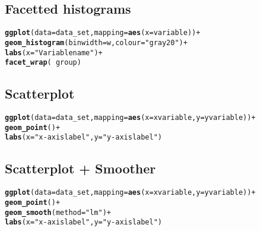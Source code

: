 \documentclass[10pt]{report}\usepackage[]{graphicx}\usepackage[]{color}
\makeatletter
\newcommand{\hlstr}[1]{\textcolor[rgb]{0.192,0.494,0.8}{#1}}%
\newcommand{\hlopt}[1]{\textcolor[rgb]{0,0,0}{#1}}%
\newcommand{\hlstd}[1]{\textcolor[rgb]{0.345,0.345,0.345}{#1}}%
\newcommand{\hlkwc}[1]{\textcolor[rgb]{0.333,0.667,0.333}{#1}}%
\newcommand{\hlkwd}[1]{\textcolor[rgb]{0.737,0.353,0.396}{\textbf{#1}}}%
\newenvironment{kframe}{%
 \def\at@end@of@kframe{}%
 \ifinner\ifhmode%
  \def\at@end@of@kframe{\end{minipage}}%
  \begin{minipage}{\columnwidth}%
 \fi\fi%
 \def\FrameCommand##1{\hskip\@totalleftmargin \hskip-\fboxsep
 \colorbox{shadecolor}{##1}\hskip-\fboxsep
     \hskip-\linewidth \hskip-\@totalleftmargin \hskip\columnwidth}%
 \MakeFramed {\advance\hsize-\width
   \@totalleftmargin\z@ \linewidth\hsize
   \@setminipage}}%
 {\par\unskip\endMakeFramed%
 \at@end@of@kframe}
\newenvironment{knitrout}{}{} %
\makeatother
\begin{document}
\begin{multicols}{2}
\subsection*{Facetted histograms}
\begin{knitrout}\small
{}\color{fgcolor}\begin{kframe}
\begin{alltt}
\hlkwd{ggplot}\hlstd{(}\hlkwc{data} \hlstd{= data_set,} \hlkwc{mapping} \hlstd{=} \hlkwd{aes}\hlstd{(}\hlkwc{x} \hlstd{= variable))} \hlopt{+}
  \hlkwd{geom_histogram}\hlstd{(}\hlkwc{binwidth} \hlstd{= w,} \hlkwc{colour} \hlstd{=} \hlstr{"gray20"}\hlstd{)} \hlopt{+}
  \hlkwd{labs}\hlstd{(}\hlkwc{x} \hlstd{=} \hlstr{"Variable name"}\hlstd{)} \hlopt{+}
  \hlkwd{facet_wrap}\hlstd{(}\hlopt{~} \hlstd{group)}
\end{alltt}
\end{kframe}
\end{knitrout}
\squeeze
\subsection*{Scatterplot}
\begin{knitrout}\small
{}\color{fgcolor}\begin{kframe}
\begin{alltt}
\hlkwd{ggplot}\hlstd{(}\hlkwc{data} \hlstd{= data_set,} \hlkwc{mapping} \hlstd{=} \hlkwd{aes}\hlstd{(}\hlkwc{x} \hlstd{= xvariable,} \hlkwc{y} \hlstd{= yvariable))} \hlopt{+}
  \hlkwd{geom_point}\hlstd{()} \hlopt{+}
  \hlkwd{labs}\hlstd{(}\hlkwc{x} \hlstd{=} \hlstr{"x-axis label"}\hlstd{,} \hlkwc{y} \hlstd{=} \hlstr{"y-axis label"}\hlstd{)}
\end{alltt}
\end{kframe}
\end{knitrout}
\squeeze
\subsection*{Scatterplot + Smoother}
\begin{knitrout}\small
{}\color{fgcolor}\begin{kframe}
\begin{alltt}
\hlkwd{ggplot}\hlstd{(}\hlkwc{data} \hlstd{= data_set,} \hlkwc{mapping} \hlstd{=} \hlkwd{aes}\hlstd{(}\hlkwc{x} \hlstd{= xvariable,} \hlkwc{y} \hlstd{= yvariable))} \hlopt{+}
  \hlkwd{geom_point}\hlstd{()} \hlopt{+}
  \hlkwd{geom_smooth}\hlstd{(}\hlkwc{method} \hlstd{=} \hlstr{"lm"}\hlstd{)} \hlopt{+}
  \hlkwd{labs}\hlstd{(}\hlkwc{x} \hlstd{=} \hlstr{"x-axis label"}\hlstd{,} \hlkwc{y} \hlstd{=} \hlstr{"y-axis label"}\hlstd{)}
\end{alltt}
\end{kframe}
\end{knitrout}


\end{multicols}
\end{document}
